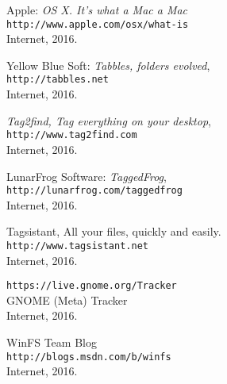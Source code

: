 \begin{thebibliography}{9}
Apple: \textit{OS X. It's what a Mac a Mac} \\
\texttt{http://www.apple.com/osx/what-is} \\
Internet, 2016.

Yellow Blue Soft: \emph{Tabbles, folders evolved}, \\
\texttt{http://tabbles.net} \\
Internet, 2016.

\emph{Tag2find, Tag everything on your desktop}, \\
\texttt{http://www.tag2find.com} \\
Internet, 2016.

LunarFrog Software: \emph{TaggedFrog}, \\
\texttt{http://lunarfrog.com/taggedfrog} \\
Internet, 2016.

Tagsistant, All your files, quickly and easily. \\
\texttt{http://www.tagsistant.net} \\
Internet, 2016.

\texttt{https://live.gnome.org/Tracker} \\
GNOME (Meta) Tracker \\
Internet, 2016.

WinFS Team Blog \\
\texttt{http://blogs.msdn.com/b/winfs} \\
Internet, 2016.

\end{thebibliography}

